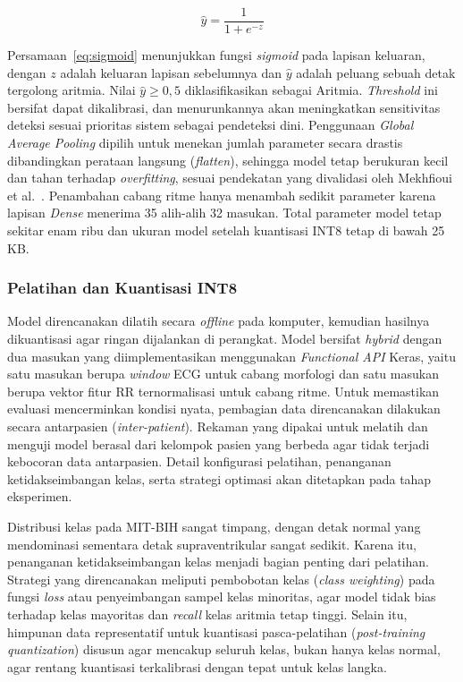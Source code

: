 \begin{equation}
\label{eq:sigmoid}
\hat{y} = \frac{1}{1+e^{-z}}
\end{equation}

Persamaan~\ref{eq:sigmoid} menunjukkan fungsi \textit{sigmoid} pada lapisan
keluaran, dengan $z$ adalah keluaran lapisan sebelumnya dan $\hat{y}$ adalah
peluang sebuah detak tergolong aritmia. Nilai $\hat{y} \geq 0{,}5$
diklasifikasikan sebagai Aritmia. \textit{Threshold} ini bersifat dapat dikalibrasi, dan
menurunkannya akan meningkatkan sensitivitas deteksi sesuai prioritas sistem
sebagai pendeteksi dini. Penggunaan \textit{Global Average Pooling} dipilih
untuk menekan jumlah parameter secara drastis dibandingkan perataan langsung
(\textit{flatten}), sehingga model tetap berukuran kecil dan tahan terhadap
\textit{overfitting}, sesuai pendekatan yang divalidasi oleh Mekhfioui
et al.~\cite{mekhfioui_2025}. Penambahan cabang ritme hanya menambah sedikit
parameter karena lapisan \textit{Dense} menerima 35 alih-alih 32 masukan.
Total parameter model tetap sekitar enam ribu dan ukuran model
setelah kuantisasi INT8 tetap di bawah 25 KB.

\subsubsection{Pelatihan dan Kuantisasi INT8}

Model direncanakan dilatih secara \textit{offline} pada komputer, kemudian hasilnya dikuantisasi agar ringan dijalankan di perangkat. Model bersifat \textit{hybrid} dengan dua masukan yang diimplementasikan menggunakan \textit{Functional API} Keras, yaitu satu masukan berupa \textit{window} ECG untuk cabang morfologi dan satu masukan berupa vektor fitur RR ternormalisasi untuk cabang ritme. Untuk memastikan evaluasi mencerminkan kondisi nyata, pembagian data direncanakan dilakukan secara antarpasien (\textit{inter-patient}). Rekaman yang dipakai untuk melatih dan menguji model berasal dari kelompok pasien yang berbeda agar tidak terjadi kebocoran data antarpasien. Detail konfigurasi pelatihan, penanganan ketidakseimbangan kelas, serta strategi optimasi akan ditetapkan pada tahap eksperimen.

Distribusi kelas pada MIT-BIH sangat timpang, dengan detak normal yang mendominasi
sementara detak supraventrikular sangat sedikit. Karena itu, penanganan ketidakseimbangan kelas
menjadi bagian penting dari pelatihan. Strategi yang direncanakan meliputi pembobotan
kelas (\emph{class weighting}) pada fungsi \emph{loss} atau penyeimbangan sampel kelas
minoritas, agar model tidak bias terhadap kelas mayoritas dan \emph{recall} kelas
aritmia tetap tinggi. Selain itu, himpunan
data representatif untuk kuantisasi pasca-pelatihan (\emph{post-training quantization})
disusun agar mencakup seluruh kelas, bukan hanya kelas normal, agar rentang
kuantisasi terkalibrasi dengan tepat untuk kelas langka.

